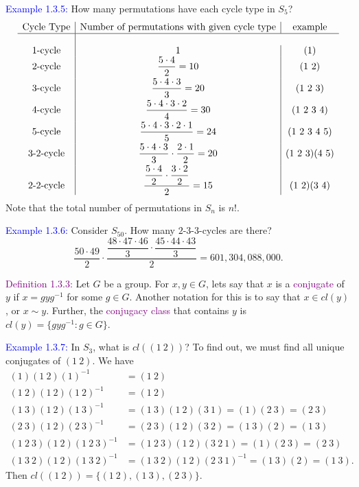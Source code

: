 \documentclass{article}
\begin{document}
\textcolor{blue}{Example 1.3.5:} How many permutations have each cycle type in $S_5$?
\[
    \begin{array}{c|c|c}
        \text{Cycle Type} & \text{Number of permutations with given cycle type} & \text{example} \\
        \hline \\
        1\text{-cycle} & 1 & (1) \\
        2\text{-cycle} & \dfrac{5 \cdot 4}{2} = 10 & (1 \ 2) \\[6pt]
        3\text{-cycle} & \dfrac{5 \cdot 4 \cdot 3}{3}= 20 & (1 \ 2 \ 3) \\[6pt]
        4\text{-cycle} & \dfrac{5 \cdot 4 \cdot 3 \cdot 2}{4}=30 & (1 \ 2 \ 3 \ 4) \\[6pt]
        5\text{-cycle} & \dfrac{5 \cdot 4 \cdot 3 \cdot 2 \cdot 1}{5}=24 & (1 \ 2 \ 3 \ 4 \ 5) \\[6pt]
        3\text{-}2\text{-cycle} & \dfrac{5 \cdot 4 \cdot 3}{3} \cdot \dfrac{2 \cdot 1}{2} = 20 & (1 \ 2 \ 3)(4 \ 5) \\[6pt]
        2\text{-}2\text{-cycle} & \dfrac{\dfrac{5 \cdot 4}{2} \cdot \dfrac{3 \cdot 2}{2}}{2} = 15 & (1 \ 2)(3 \ 4)
    \end{array}
\]
Note that the total number of permutations in $S_n$ is $n!$.

\textcolor{blue}{Example 1.3.6:} Consider $S_{50}$. How many $2$-$3$-$3$-cycles are there?
\[
    \dfrac{50 \cdot 49}{2} \cdot \dfrac{\dfrac{48 \cdot 47 \cdot 46}{3} \cdot \dfrac{45 \cdot 44 \cdot 43}{3}}{2}=601,304,088,000.
\]

\textcolor{purple}{Definition 1.3.3:} Let $G$ be a group. For $x,y \in G$, lets say that $x$ is a \textcolor{purple}{conjugate} of $y$ if 
$x = gyg^{-1}$ for some
$g \in G$. Another notation for this is to say that $x \in cl(y)$, or $x \sim y$. Further, the \textcolor{purple}{conjugacy class} that 
contains $y$ is
$cl(y) = \{gyg^{-1}:g \in G\}$. 

\textcolor{blue}{Example 1.3.7:} In $S_3$, what is $cl((1 \ 2))$? To find out, we must find all unique conjugates of $(1 \ 2)$. We have
\begin{align*}
    (1)(1 \ 2)(1)^{-1} &= (1 \ 2) \\
    (1 \ 2)(1 \ 2)(1 \ 2)^{-1} &= (1 \ 2) \\
    (1 \ 3)(1 \ 2)(1 \ 3)^{-1} &= (1 \ 3)(1 \ 2)(3 \ 1) = (1)(2 \ 3) = (2 \ 3) \\
    (2 \ 3)(1 \ 2)(2 \ 3)^{-1} &= (2 \ 3)(1 \ 2)(3 \ 2) = (1 \ 3)(2) = (1 \ 3) \\
    (1 \ 2 \ 3)(1 \ 2)(1 \ 2 \ 3)^{-1} &= (1 \ 2 \ 3)(1 \ 2)(3 \ 2 \ 1) = (1)(2 \ 3) = (2 \ 3) \\
    (1 \ 3 \ 2)(1 \ 2)(1 \ 3 \ 2)^{-1} &= (1 \ 3 \ 2)(1 \ 2)(2 \ 3 \ 1)^{-1} = (1 \ 3)(2) = (1 \ 3).
\end{align*}
Then $cl((1 \ 2)) = \{(1 \ 2), (1 \ 3), (2 \ 3)\}$.
\end{document}
